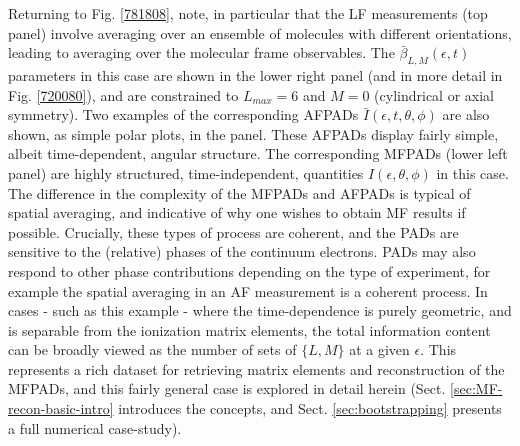 \documentclass[10pt]{article}
\begin{document}

Returning to Fig. \ref{781808}, note, in particular that the LF measurements (top panel) involve averaging over an ensemble of molecules with different orientations, leading to averaging over the molecular frame observables. The $\bar{\beta}_{L,M}(\epsilon,t)$ parameters in this case are shown in the lower right panel (and in more detail in Fig. \ref{720080}), and are constrained to $L_{max}=6$ and $M=0$ (cylindrical or axial symmetry). Two examples of the corresponding AFPADs $\bar{I}(\epsilon,t,\theta,\phi)$ are also shown, as simple polar plots, in the panel. These AFPADs display fairly simple, albeit time-dependent, angular structure. 
The corresponding MFPADs (lower left panel) are highly structured,  time-independent, quantities $I(\epsilon,\theta,\phi)$ in this case. The difference in the complexity of the MFPADs and AFPADs is typical of spatial averaging, and indicative of why one wishes to obtain MF results if possible. Crucially, these types of process are coherent, and the PADs are sensitive to the (relative) phases of the continuum electrons. PADs may also respond to other phase contributions depending on the type of experiment, for example the spatial averaging in an AF measurement is a coherent process.
In cases - such as this example - where the time-dependence is purely geometric, and is separable from the ionization matrix elements, the total information content can be broadly viewed as the number of sets of $\{L,M\}$ at a given $\epsilon$. 
This represents a rich dataset for retrieving matrix elements and reconstruction of the MFPADs, and this fairly general case is explored in detail herein (Sect. \ref{sec:MF-recon-basic-intro} introduces the concepts, and Sect. \ref{sec:bootstrapping} presents a full numerical case-study). 
\end{document}
